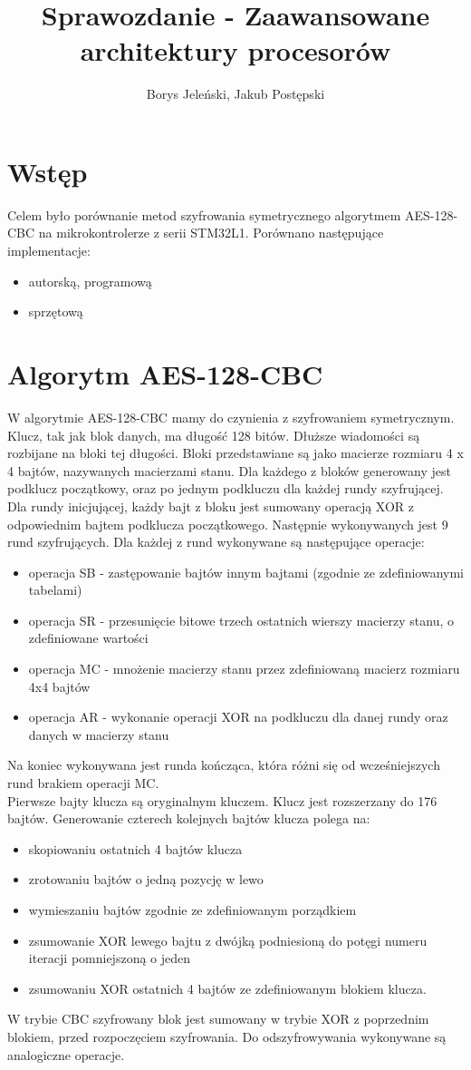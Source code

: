 \documentclass[a4paper, 10pt]{article}
\author{Borys Jeleński, Jakub Postępski}
\title{Sprawozdanie - Zaawansowane architektury procesorów}
\begin{document}
	\maketitle
	\section{Wstęp}
	Celem było porównanie metod szyfrowania symetrycznego algorytmem AES-128-CBC\cite{bib:AES} na mikrokontrolerze z serii STM32L1. Porównano następujące implementacje:
	\begin{itemize}
		\item autorską, programową
		\item sprzętową
	\end{itemize}
	\section{Algorytm AES-128-CBC}
	\label{sec:aes}
	W algorytmie AES-128-CBC mamy do czynienia z szyfrowaniem symetrycznym. Klucz, tak jak blok danych, ma długość 128 bitów. Dłuższe wiadomości są rozbijane na bloki tej długości. Bloki przedstawiane są jako macierze rozmiaru 4 x 4 bajtów, nazywanych macierzami stanu. Dla każdego z bloków generowany jest podklucz początkowy, oraz po jednym podkluczu dla każdej rundy szyfrującej. Dla rundy inicjującej, każdy bajt z bloku jest sumowany operacją XOR z odpowiednim bajtem podklucza początkowego. Następnie wykonywanych jest 9 rund szyfrujących. Dla każdej z rund wykonywane są następujące operacje:
	\begin{itemize}
	\item operacja SB - zastępowanie bajtów innym bajtami (zgodnie ze zdefiniowanymi tabelami)
	\item operacja SR - przesunięcie bitowe trzech ostatnich wierszy macierzy stanu, o zdefiniowane wartości
	\item operacja MC - mnożenie macierzy stanu przez zdefiniowaną macierz rozmiaru 4x4 bajtów
	\item operacja AR - wykonanie operacji XOR na podkluczu dla danej rundy oraz danych w macierzy stanu
	\end{itemize}
	Na koniec wykonywana jest runda kończąca, która różni się od wcześniejszych rund brakiem operacji MC.\\
	Pierwsze bajty klucza są oryginalnym kluczem. Klucz jest rozszerzany do 176 bajtów. Generowanie czterech kolejnych bajtów klucza polega na:
	\begin{itemize}
	\item skopiowaniu ostatnich 4 bajtów klucza
	\item zrotowaniu bajtów o jedną pozycję w lewo
	\item wymieszaniu bajtów zgodnie ze zdefiniowanym porządkiem
	\item zsumowanie XOR lewego bajtu z dwójką podniesioną do potęgi numeru iteracji pomniejszoną o jeden
	\item zsumowaniu XOR ostatnich 4 bajtów ze zdefiniowanym blokiem klucza.
	\end{itemize}
	W trybie CBC szyfrowany blok jest sumowany w trybie XOR z poprzednim blokiem, przed rozpoczęciem szyfrowania. Do odszyfrowywania wykonywane są analogiczne operacje. 
	
\end{document}
